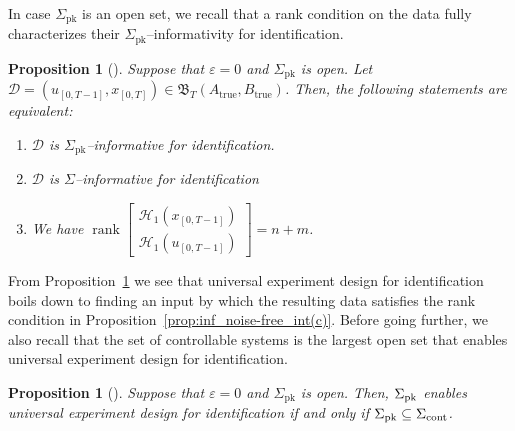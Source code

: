 \documentclass[journal,twoside,web]{ieeecolor}
\DeclareMathOperator{\rank}{rank}
\newtheorem{proposition}[theorem]{Proposition}
\begin{document}
In case $\Sigma_\text{pk}$ is an open set, we recall that a rank condition on the data fully characterizes their $\Sigma_\text{pk}$--informativity for identification.
\begin{proposition}[{\cite[Thm. 3]{shakouri2025exp}}]
\label{prop:inf_noise-free_int}
Suppose that $\varepsilon=0$ and $\Sigma_\text{pk}$ is open. Let $\mathcal{D}=(u_{[0,T-1]},x_{[0,T]})\in\mathfrak{B}_T(A_\text{true},B_\text{true})$. Then, the following statements are \emph{equivalent}:
\begin{enumerate}[label=(\alph*),ref=\ref{prop:inf_noise-free_int}(\alph*)]
    \item\label{prop:inf_noise-free_int(a)} $\mathcal{D}$ is $\Sigma_\text{pk}$--informative for identification.
    \item\label{prop:inf_noise-free_int(b)} $\mathcal{D}$ is $\Sigma$--informative for identification
    \item\label{prop:inf_noise-free_int(c)} We have $\rank \begin{bmatrix}
\mathcal{H}_1(x_{[0,T-1]}) \\
\mathcal{H}_1(u_{[0,T-1]})
\end{bmatrix}=n+m$.
\end{enumerate}
\end{proposition}

From Proposition~\ref{prop:inf_noise-free_int} we see that universal experiment design for identification boils down to finding an input by which the resulting data satisfies the rank condition in Proposition~\ref{prop:inf_noise-free_int(c)}. Before going further, we also recall that the set of controllable systems is the largest open set that enables universal experiment design for identification. 

\begin{proposition}[{\cite[Cor. 9]{shakouri2025exp}}]
\label{prop:ctrl_nec}
Suppose that $\varepsilon=0$ and $\Sigma_\text{pk}$ is open. Then, $\Sigma_\textup{pk}$ enables universal experiment design for identification \emph{if and only if} $\Sigma_\textup{pk}\subseteq\Sigma_\text{cont}$.
\end{proposition}
\end{document}
